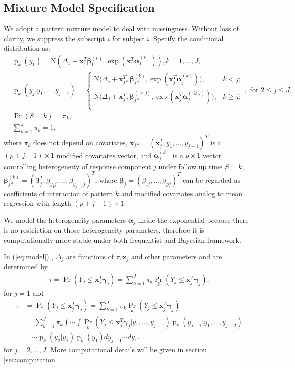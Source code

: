 \documentclass[12pt]{article}
\DeclareMathOperator{\pr}{p}
\DeclareMathOperator{\prob}{Pr}
\begin{document}
\subsection{Mixture Model Specification}
\label{sec:settings}
We adopt a pattern mixture model to deal with
missingness. 
Without loss of clarity, we suppress the subscript $i$ for subject
$i$. Specify the conditional distribution as:
\begin{align}
  & \pr_k(y_1) = \textrm{N} (\Delta_1 + \bm x_1^T \bm \beta_1^{(k)},
  \exp (\bm x_{1}^T \bm \alpha_1^{(k)} ) ), k = 1, \ldots, J, \label{eq:model}\\
  &\pr_k(y_j|y_1, \ldots, y_{j-1}) =
  \begin{cases}
    \textrm{N} \big (\Delta_j + \bm x_{j*}^T \bm \beta_{j*}^{(k)},
    \exp (\bm x_{j}^T \bm \alpha_j^{(k)} ) \big), & k < j ;  \nonumber \\
    \textrm{N} \big (\Delta_j + \bm x_{j*}^T \bm \beta_{j*}^{(\geq
      j)},
    \exp (\bm x_{j}^T \bm \alpha_j^{(\geq j)} ) \big), & k \geq j ; \nonumber \\
  \end{cases}, \text{ for } 2 \leq j \leq J, \nonumber \\
  & \prob (S = k)  = \pi_k, \nonumber \\
  & \sum_{k=1}^J \pi_k = 1, \nonumber
\end{align}
where $\pi_k$ does not depend on covariates, $\bm x_{j*} = (\bm x_j^T,
y_1, \ldots, y_{j-1})^T$ is a $(p + j - 1) \times 1$ modified
covariates vector, and $\bm \alpha_j^{(k)}$ is a $p \times 1$ vector
controlling heterogeneity of response component $j$ under follow up
time $S = k$, $\bm \beta_{j*}^{(k)} = (\bm \beta_j^T, \beta_{y_1j},
\ldots, \beta_{y_{j-1}j})^T$, where $\bm \beta_j = (\beta_{1j},
\ldots, \beta_{pj})^{T}$  can be
regarded as coefficients of interaction of pattern $k$ and modified
covariates analog to mean regression with length $ (p + j - 1) \times
1$.

We model the heterogeneity parameters $\bm \alpha_j$ inside the
exponential because there is no restriction on those heterogeneity
parameters, therefore it is computationally more stable under both
frequentist and Bayesian framework.

In  (\ref{eq:model}) , $\Delta_j$ are
functions of $\tau, \bm x_j$ and other parameters and are
determined by
\begin{align}
  \label{eq:deltaeqn1}
  \tau = \prob (Y_j \leq \bm x_j^T \bm \gamma_j ) = \sum_{k=1}^J
  \pi_k\prob_k (Y_j \leq \bm x_j^T \bm \gamma_j ),
\end{align}
for $j = 1$ and
\begin{align}\label{eq:deltaeqn2}
  \tau &= \prob (Y_j \leq \bm x_j^{T} \bm \gamma_j ) = \sum_{k=1}^J
  \pi_k\prob_k (Y_j \leq \bm x_j^{T} \bm \gamma_j ) \\
  & = \sum_{k=1}^J \pi_k \int\cdots \int \prob_k (Y_j \leq \bm x_j^{T}
  \bm \gamma_j |y_1,\ldots,
  y_{j-1}) \pr_k (y_{j-1}| y_1, \ldots, y_{j-2})  \nonumber \\
  & \quad \cdots \pr_k (y_{2}| y_1) \pr_k(y_1) dy_{j-1}\cdots
  dy_1. \nonumber
\end{align}
for $j = 2, \ldots, J$. More computational details will be given in
section \ref{sec:computation}.
\end{document}
